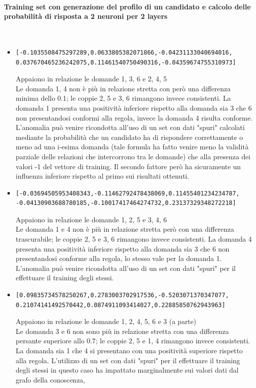 \documentclass[11pt,a4paper,italian]{article}
\begin{document}
\paragraph{Training set con generazione del profilo di un candidato e calcolo delle probabilit\`a di risposta a  2 neuroni per 2 layers}\mbox{}
\label{Training set con generazione del profilo di un candidato e calcolo delle probabilita di risposta a  2 neuroni}
\\
\noindent
\begin{itemize}
\item  \begin{verbatim}[-0.1035508475297289,0.0633805382071866,-0.04231133040694016,
0.037670465236242075,0.11461540750490316,-0.04359674755310973]\end{verbatim}
Appaiono in relazione le domande 1, 3, 6 e 2, 4, 5\\
Le domanda 1, 4 non \`e pi\`u in relazione stretta con per\`o una differenza minima dello 0.1; le coppie 2, 5 e 3, 6 rimangono invece consistenti. La domanda 1 presenta una positivit\`a inferiore rispetto alla domanda sia 3 che 6 non presentandosi conformi alla regola, invece la domanda 4 risulta conforme. L'anomalia pu\`o venire ricondotta all'uso di un set con dati "spuri" calcolati mediante la probabilit\`a che un candidato ha di rispondere correttamente o meno ad una i-esima domanda (tale formula ha fatto venire meno la validit\`a parziale delle relazioni che intercorrono tra le domande) che alla presenza dei valori -1 del vettore di training. Il secondo fattore per\`o ha sicuramente un influenza inferiore rispetto al primo sui risultati ottenuti.

\item  \begin{verbatim}[-0.03694505953408343,-0.11462792478438069,0.11455401234234787,
-0.04130903688780185,-0.10017417464274732,0.23137329348272218]\end{verbatim}
Appaiono in relazione le domande 1, 2, 5 e 3, 4, 6\\
Le domanda 1 e 4 non \`e pi\`u in relazione stretta per\`o con una differenza trascurabile; le coppie 2, 5 e 3, 6 rimangono invece consistenti. La domanda 4 presenta una positivit\`a inferiore rispetto alla domanda sia 3 che 6 non presentandosi conforme alla regola, lo stesso vale per la domanda 1. L'anomalia pu\`o venire ricondotta all'uso di un set con dati "spuri" per il effettuare il training degli stessi.

\item  \begin{verbatim}[0.09835734578250267,0.2783003702917536,-0.5203071370347077,
0.21074141492570442,0.0874911093414027,0.22885850762943963]\end{verbatim}
Appaiono in relazione le domande 1, 2, 4, 5, 6 e 3 (a parte)\\
Le domanda 3 e 6  non sono pi\`u in relazione stretta con una differenza persante superiore allo 0.7; le coppie 2, 5 e 1, 4 rimangono invece consistenti. La domanda sia 1 che 4 si presentano con una positivit\`a superiore rispetto alla regola. L'utilizzo di  un set con dati "spuri" per il effettuare il training degli stessi in questo caso ha impattato marginalmente sui valori dati dal grafo della conoscenza,


\end{itemize}
\end{document}
